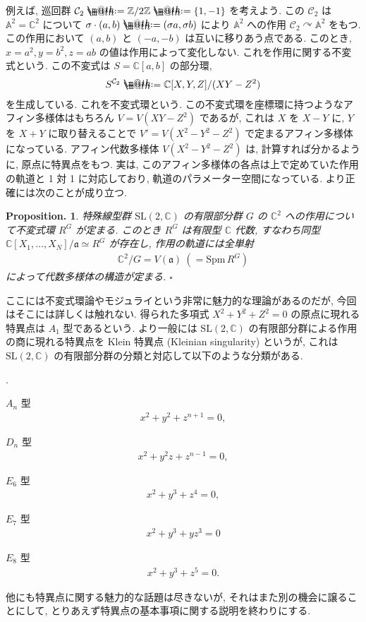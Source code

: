 \documentclass[openany, a4paper, oneside]{jsbook}
\makeatletter
\newcounter{enum2}
\renewenvironment{enumerate}{%
\begin{list}%
{%
\arabic{enum2}.\ \,%
}%
{%
\usecounter{enum2}
\setlength{\itemindent}{0pt}%
\setlength{\leftmargin}{15pt}%
\setlength{\rightmargin}{0pt}%
\setlength{\labelsep}{0pt}%
\setlength{\labelwidth}{6pt}%
\setlength{\itemsep}{0pt}%
\setlength{\parsep}{0pt}%
\setlength{\listparindent}{0pt}%
}
}{%
\end{list}%
}
\newcommand*{\defeq}{\mathrel{\rlap{%
\raisebox{0.3ex}{$\m@th\cdot$}}%
\raisebox{-0.3ex}{$\m@th\cdot$}}%
=}
\theoremstyle{break}
\theoremstyle{breakdefn}
\newtheorem{prop}[thm]{Proposition.}
\newcommand{\cbk}[1]{\left\{#1\right\}}
\newcommand{\fin}{\hfill $\square$ \par}
\makeatother
\begin{document}
例えば, 巡回群 $\mathcal{C}_2 \defeq \mathbb{Z} / 2\mathbb{Z} \defeq \cbk{1, -1}$ を考えよう.
この $\mathcal{C}_2$ は $\mathbb{A}^2 = \mathbb{C}^2$ について
$\sigma \cdot (a,b) \defeq (\sigma a, \sigma b)$ により $\mathbb{A}^2$ への作用
$\mathcal{C}_2 \curvearrowright \mathbb{A}^2$ をもつ.
この作用において $(a,b)$ と $(-a,-b)$ は互いに移りあう点である.
このとき, $x=a^2, y=b^2, z=ab$ の値は作用によって変化しない.
これを作用に関する不変式という.
この不変式は $S=\mathbb{C}[a,b]$ の部分環,
\begin{align}
 S^{\mathcal{C}_2}
 \defeq
 \mathbb{C}[X,Y,Z]/ (XY-Z^2)
\end{align}
を生成している.
これを不変式環という.
この不変式環を座標環に持つようなアフィン多様体はもちろん $V=V (XY-Z^2)$ であるが,
これは $X$ を $X-Y$ に, $Y$ を $X+Y$ に取り替えることで $V'=V (X^2-Y^2-Z^2)$ で定まるアフィン多様体になっている.
アフィン代数多様体 $V (X^2-Y^2-Z^2)$ は, 計算すれば分かるように, 原点に特異点をもつ.
実は, このアフィン多様体の各点は上で定めていた作用の軌道と 1 対 1 に対応しており, 軌道のパラメーター空間になっている.
より正確には次のことが成り立つ.
\begin{prop}
 特殊線型群 $\mathrm{SL}(2,\mathbb{C})$ の有限部分群 $G$ の $\mathbb{C}^2$ への作用について不変式環 $R^G$ が定まる.
 このとき $R^G$ は有限型 $\mathbb{C}$ 代数,
 すなわち同型 $\mathbb{C}[X_1,\dots,X_N]/\mathfrak{a} \simeq R^G$ が存在し,
 作用の軌道には全単射
 \begin{align}
  \mathbb{C}^2/G
  =
  V (\mathfrak{a}) ~ (= \mathrm{Spm}\,R^G )
 \end{align}
 によって代数多様体の構造が定まる. \fin
\end{prop}
ここには不変式環論やモジュライという非常に魅力的な理論があるのだが, 今回はそこには詳しくは触れない.
得られた多項式 $X^2+Y^2+Z^2=0$ の原点に現れる特異点は $A_1$ 型であるという.
より一般には $\mathrm{SL}(2,\mathbb{C})$ の有限部分群による作用の商に現れる特異点を
Klein 特異点 (Kleinian singularity) というが,
これは $\mathrm{SL}(2,\mathbb{C})$ の有限部分群の分類と対応して以下のような分類がある.
\begin{enumerate}
\item $A_n$ 型
   \begin{align}
    x^2 + y^2 + z^{n+1} = 0,
   \end{align}
\item $D_n$ 型
   \begin{align}
    x^2 + y^2z + z^{n-1} = 0,
   \end{align}
\item $E_6$ 型
   \begin{align}
    x^2+y^3+z^4=0,
   \end{align}
\item $E_7$ 型
   \begin{align}
    x^2+y^3+yz^3=0
   \end{align}
\item $E_8$ 型
   \begin{align}
    x^2+y^3+z^5=0.
   \end{align}
\end{enumerate}
他にも特異点に関する魅力的な話題は尽きないが,
それはまた別の機会に譲ることにして, とりあえず特異点の基本事項に関する説明を終わりにする.
\end{document}
